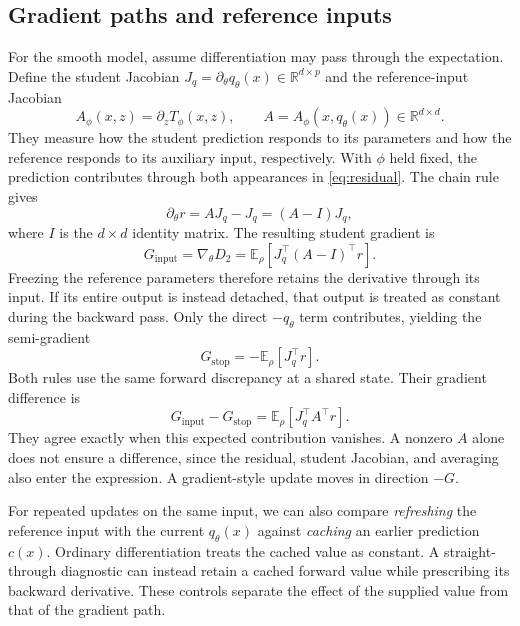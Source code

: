 \documentclass[11pt,a4paper]{article}
\newcommand{\E}{\mathbb{E}}
\newcommand{\R}{\mathbb{R}}
\begin{document}
\subsection{Gradient paths and reference inputs}
For the smooth model, assume differentiation may pass through the expectation. Define the student Jacobian $J_q=\partial_\theta q_\theta(x)\in\R^{d\times p}$ and the reference-input Jacobian
\begin{equation}
A_\phi(x,z)=\partial_z T_\phi(x,z),\qquad A=A_\phi(x,q_\theta(x))\in\R^{d\times d}.
\end{equation}
They measure how the student prediction responds to its parameters and how the reference responds to its auxiliary input, respectively. With $\phi$ held fixed, the prediction contributes through both appearances in \eqref{eq:residual}. The chain rule gives
\[
\partial_\theta r=AJ_q-J_q=(A-I)J_q,
\]
where $I$ is the $d\times d$ identity matrix. The resulting student gradient is
\begin{equation}
G_{\mathrm{input}}=\nabla_\theta D_2
=\E_\rho\left[J_q^\top(A-I)^\top r\right].
\label{eq:inputgrad}
\end{equation}
Freezing the reference parameters therefore retains the derivative through its input. If its entire output is instead detached, that output is treated as constant during the backward pass. Only the direct $-q_\theta$ term contributes, yielding the semi-gradient
\begin{equation}
G_{\mathrm{stop}}=-\E_\rho\left[J_q^\top r\right].
\label{eq:stopgrad}
\end{equation}
Both rules use the same forward discrepancy at a shared state. Their gradient difference is
\begin{equation}
G_{\mathrm{input}}-G_{\mathrm{stop}}
=\E_\rho\left[J_q^\top A^\top r\right].
\label{eq:gradientdifference}
\end{equation}
They agree exactly when this expected contribution vanishes. A nonzero $A$ alone does not ensure a difference, since the residual, student Jacobian, and averaging also enter the expression. A gradient-style update moves in direction $-G$.

For repeated updates on the same input, we can also compare \emph{refreshing} the reference input with the current $q_\theta(x)$ against \emph{caching} an earlier prediction $c(x)$. Ordinary differentiation treats the cached value as constant. A straight-through diagnostic can instead retain a cached forward value while prescribing its backward derivative. These controls separate the effect of the supplied value from that of the gradient path.
\end{document}
